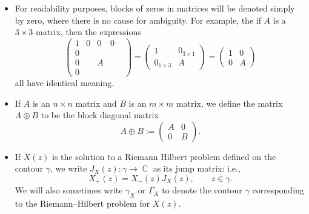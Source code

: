 \documentclass[pdftex]{sigma}
\DeclareMathOperator{\CC}{\mathbb{C}}
\numberwithin{equation}{section}
\begin{document}
\begin{itemize}
\begin{equation*}
 \end{equation*}
 The matrix $\hat{\sigma}_{ij}$ permutes the $i^{\rm th}$ and $j^{\rm th}$ row and column of a given matrix $A$ by conjugation; again using our example of $\hat{\sigma}_{24}$,
 \begin{equation*}
 \hat{\sigma}_{24} A \hat{\sigma}_{24} =
 \hat{\sigma}_{24}\begin{pmatrix}
 a_{11} & a_{12} & a_{13} & a_{14}\\
 a_{21} & a_{22} & a_{23} & a_{24}\\
 a_{31} & a_{32} & a_{33} & a_{34}\\
 a_{41} & a_{42} & a_{43} & a_{44}
 \end{pmatrix}\hat{\sigma}_{24}
 = \begin{pmatrix}
 a_{11} & a_{14} & a_{13} & a_{12}\\
 a_{41} & a_{44} & a_{43} & a_{42}\\
 a_{31} & a_{34} & a_{33} & a_{32}\\
 a_{21} & a_{24} & a_{23} & a_{22}
 \end{pmatrix}.
 \end{equation*}
 \item For readability purposes, blocks of zeros in matrices will be denoted simply by zero, where there is no cause for ambiguity. For example, the if $A$ is a $3\times 3$ matrix, then the expressions
 \begin{equation*}
 \begin{pmatrix}
 1 & 0 & 0 & 0\\
 0 & & & & \\
 0 & & A & \\
 0 & & &
 \end{pmatrix}=
 \begin{pmatrix}
 1 & 0_{3\times 1}\\
 0_{1\times 3} & A
 \end{pmatrix}=
 \begin{pmatrix}
 1 & 0 \\
 0 & A
 \end{pmatrix}
 \end{equation*}
 all have identical meaning.
 \item If $A$ is an $n\times n$ matrix and $B$ is an $m\times m$ matrix, we define the matrix $A\oplus B$ to be the block diagonal matrix
 \begin{equation*}
 A\oplus B :=
 \begin{pmatrix}
 A & 0\\
 0 & B
 \end{pmatrix}.
 \end{equation*}
 \item If $X(z)$ is the solution to a Riemann Hilbert problem defined on the contour $\gamma$, we write $J_X(z)\colon \gamma \to \CC$ as its jump matrix: i.e.,
 \begin{equation*}
 X_+(z) = X_-(z) J_X(z), \qquad z\in \gamma.
 \end{equation*}
 We will also sometimes write $\gamma_X$ or $\Gamma_X$ to denote the contour $\gamma$ corresponding to the Riemann--Hilbert problem for $X(z)$.
 \end{itemize}
\end{document}
